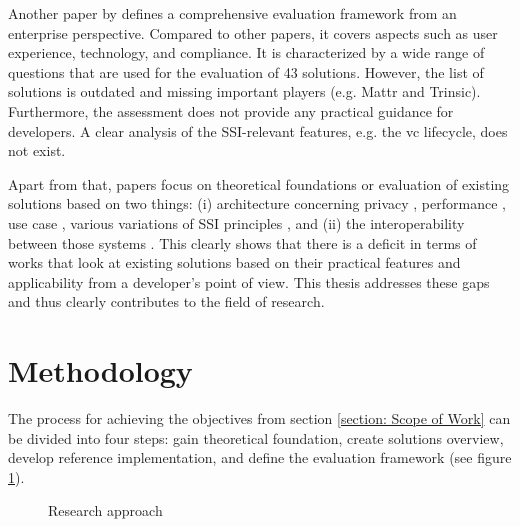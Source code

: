 	Another paper by \cite{kuperberg_blockchain-based_2020} defines a comprehensive evaluation framework from an enterprise perspective. Compared to other papers, it covers aspects such as user experience, technology, and compliance. It is characterized by a wide range of questions that are used for the evaluation of 43 solutions. However, the list of solutions is outdated and missing important players (e.g. Mattr and Trinsic). Furthermore, the assessment does not provide any practical guidance for developers. A clear analysis of the \ac{SSI}-relevant features, e.g. the \ac{vc} lifecycle, does not exist. 
	
	Apart from that, papers focus on theoretical foundations or evaluation of existing solutions based on two things: (i) architecture \cite{gruner_relevance_2018} concerning privacy \cite{bernabe_privacy-preserving_2019}, performance \cite{bouras_distributed_2020}, use case \cite{kuperberg_blockchain-based_2020}, various variations of \ac{SSI} principles \cite{allen_path_2016, allende_lopez_self-sovereign_2020, sporny_decentralized_2021, bouras_distributed_2020, cameron_laws_2005, dib_decentralized_2020, dunphy_first_2018, ferdous_search_2019, friedewald_self-sovereign_2020, van_bokkem_self-sovereign_2019}, and (ii) the interoperability between those systems \cite{homeland_security_preventing_2020, john_dhs_2020}. This clearly shows that there is a deficit in terms of works that look at existing solutions based on their practical features and applicability from a developer's point of view. This thesis addresses these gaps and thus clearly contributes to the field of research.
	
	\section{Methodology} %
    The process for achieving the objectives from section \ref{section: Scope of Work} can be divided into four steps: gain theoretical foundation, create solutions overview, develop reference implementation, and define the evaluation framework (see figure \ref{figure: approach}).
    
    \begin{figure}[ht]
	    \centering
        \caption{Research approach}
        \label{figure: approach}
    \end{figure}
	
